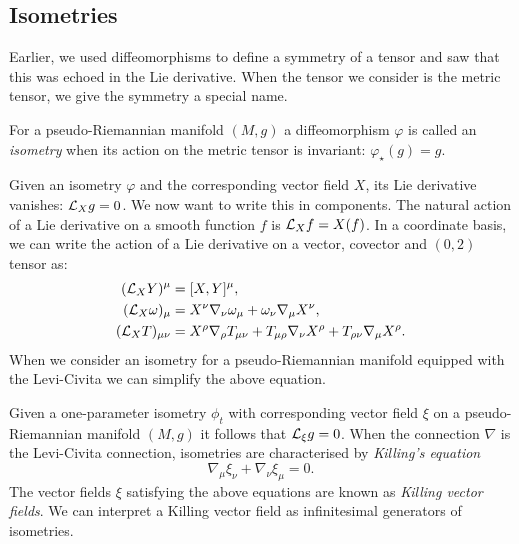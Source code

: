 \subsection{Isometries}
\label{sec:iso}
Earlier, we used diffeomorphisms to define a symmetry of a tensor and saw that this was echoed in the Lie derivative. When the tensor we consider is the metric tensor, we give the symmetry a special name.
\begin{defn}
For a pseudo-Riemannian manifold $(M,g)$ a diffeomorphism $\varphi$ is called an \emph{isometry} when its action on the metric tensor is invariant: $\varphi_\star(g) = g$.
\end{defn}
Given an isometry $\varphi$ and the corresponding vector field $X$, its Lie derivative  vanishes: ${\cal L}_X g = 0$. We now want to write this in components. The natural action of a Lie derivative on a smooth function $f$ is ${\cal L}_X f= X(f)$. In a coordinate basis, we can write the action of a Lie derivative on a vector, covector and $(0,2)$ tensor as:
\begin{equation*}
  \begin{aligned}
    ({\cal L}_X Y)^\mu &= [X, Y]^\mu, \\
    ({\cal L}_X \omega)_\mu &= X^\nu \nabla_\nu \omega_\mu + \omega_\nu \nabla_\mu X^\nu, \\
   ({\cal L}_X T)_{\mu \nu}  &= X^\rho \nabla_\rho T_{\mu \nu} + T_{\mu \rho} \nabla_\nu X^\rho + T_{\rho \nu} \nabla_\mu X^\rho .
  \end{aligned}
\end{equation*}
When we consider an isometry for a pseudo-Riemannian manifold equipped with the Levi-Civita we can simplify the above equation.
\begin{defn}
	Given a one-parameter isometry $\phi_t$ with corresponding vector field $\xi$ on a pseudo-Riemannian manifold $(M,g)$ it follows that ${\cal L}_\xi g = 0$. When the connection $\nabla$ is the Levi-Civita connection, isometries are characterised by \emph{Killing's equation}
	\begin{equation}
	\label{eq:killings}
		\nabla_\mu \xi_\nu + \nabla_\nu \xi_\mu = 0.
	\end{equation}
	The vector fields $\xi$ satisfying the above equations are known as \emph{Killing vector fields}. We can interpret a Killing vector field as infinitesimal generators of isometries.
\end{defn}


